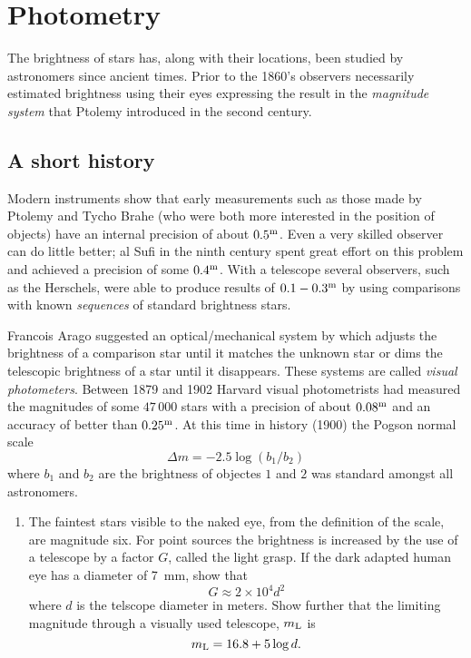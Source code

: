 \documentclass{article}
\begin{document}
\setcounter{section}{11}
\setcounter{count}{\value{enumi}}
\section{Photometry}

The brightness of stars has, along with their locations, been studied
by astronomers since ancient times. Prior to the 1860's observers
necessarily estimated brightness using their eyes expressing the
result in the {\it magnitude system} that Ptolemy introduced in the
second century. 

\subsection{A short history}

Modern instruments show that early measurements such as those made by
Ptolemy and Tycho Brahe (who were both more interested in the position
of objects) have an internal precision of about $0.5^{\rm m}$. Even a
very skilled observer can do little better; al Sufi in the ninth
century spent great effort on this problem and achieved a precision of
some $0.4^{\rm m}$. With a telescope several observers, such as the Herschels, were able to
produce results of $0.1-0.3^{\rm m}$ by using comparisons with known
{\it sequences} of standard brightness stars. 

Francois Arago suggested an optical/mechanical system by which adjusts
the brightness of a comparison star until it matches the unknown star
or dims the telescopic brightness of a star until it disappears. These
systems are called  {\it visual photometers}. Between 1879 and 1902
Harvard visual photometrists had measured the magnitudes of some
$47\,000$ stars with a precision of about $0.08^{\rm m}$ and an
accuracy of better than $0.25^{\rm m}$. At this time in history (1900)
the Pogson normal scale
\[
\Delta m=-2.5\log({b_1/b_2})
\]
where $b_1$ and $b_2$ are the brightness of objectes $1$ and $2$ was
standard amongst all astronomers. 

\begin{enumerate}
\item The faintest stars visible to the naked eye, from the definition
  of the scale, are magnitude six. For point sources the brightness is
  increased by the use of a telescope by a factor $G$, called the
  light grasp. If the dark adapted human eye has a diameter of 7~mm,
  show that 
\[
G\approx 2\times10^4 d^2
\]
where $d$ is the telscope diameter in meters. Show further that the
limiting magnitude through a visually used telescope, $m_{\rm L}$ is 
\[
m_{\rm L}=16.8+5\log d.
\]
\setcounter{count}{\value{enumi}} 
\end{enumerate}
\end{document}

